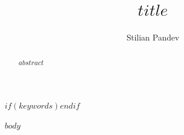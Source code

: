 \documentclass{aastex631}   %
\begin{document}
\title{$title$}
\author{Stilian Pandev}

\begin{abstract}
$abstract$
\end{abstract}
$if(keywords)$$endif$

$body$



\end{document}

